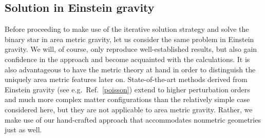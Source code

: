 \subsection{Solution in Einstein gravity}\label{section_einstein_waves}
Before proceeding to make use of the iterative solution strategy and solve the binary star in area metric gravity, let us consider the same problem in Einstein gravity. We will, of course, only reproduce well-established results, but also gain confidence in the approach and become acquainted with the calculations. It is also advantageous to have the metric theory at hand in order to distinguish the uniquely area metric features later on. State-of-the-art methods derived from Einstein gravity (see e.g.~Ref.~\ref{poisson}) extend to higher perturbation orders and much more complex matter configurations than the relatively simple case considered here, but they are not applicable to area metric gravity. Rather, we make use of our hand-crafted approach that accommodates nonmetric geometries just as well.

